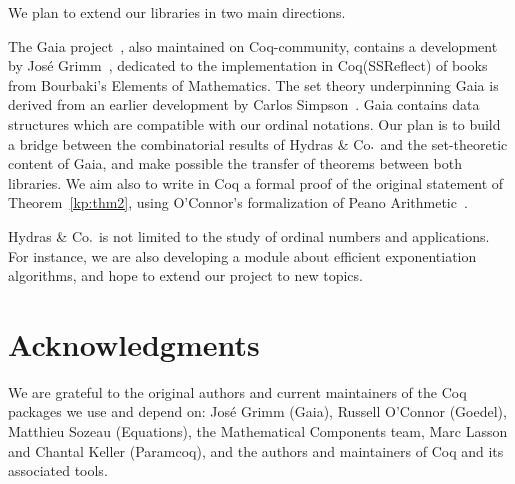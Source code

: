 \documentclass{easychair}
\newcommand{\TODO}[2][]{[\textcolor{red}{TODO (#1):} \emph{#2}]}
\newcommand{\coq}{Coq\xspace}
\newcommand{\community}{Coq-community\xspace}
\newcommand{\gaia}{Gaia\xspace}
\newcommand{\Hydras}{Hydras \& Co$\text.$\xspace}
\begin{document}





We plan to extend our libraries in two main directions.

The \gaia project~\cite{Gaia}, also maintained on \community, contains a development by José Grimm~\cite{grimm:hal-00911710},  dedicated  to the implementation in \coq (SSReflect) of books from  Bourbaki's Elements of Mathematics. The set theory underpinning \gaia is derived from an earlier development by Carlos Simpson~\cite{Simpson2004,CatsZFCContrib}. \gaia contains data structures which are compatible with our ordinal notations.
Our plan is to build a  bridge between  the combinatorial results of \Hydras and the set-theoretic content of \gaia, and make possible the transfer of theorems between both libraries.
We aim also to write in \coq a formal proof of the original statement of Theorem~\ref{kp:thm2}, using O'Connor's formalization of Peano Arithmetic~\cite{Goedel}.

 \Hydras is not limited to the study of ordinal numbers and applications.
 For instance, we are also developing 
a module about efficient exponentiation algorithms, and hope
to extend our project to new topics.

\section{Acknowledgments}
\label{sect:acks}
We are grateful to the original authors and current maintainers of the Coq packages we use and depend on: José Grimm (Gaia), Russell O'Connor (Goedel), Matthieu Sozeau (Equations), the Mathematical Components team, Marc Lasson and Chantal Keller (Paramcoq), and the authors and maintainers of \coq and its associated tools.


\label{sect:bib}

%
%
%

\end{document}
